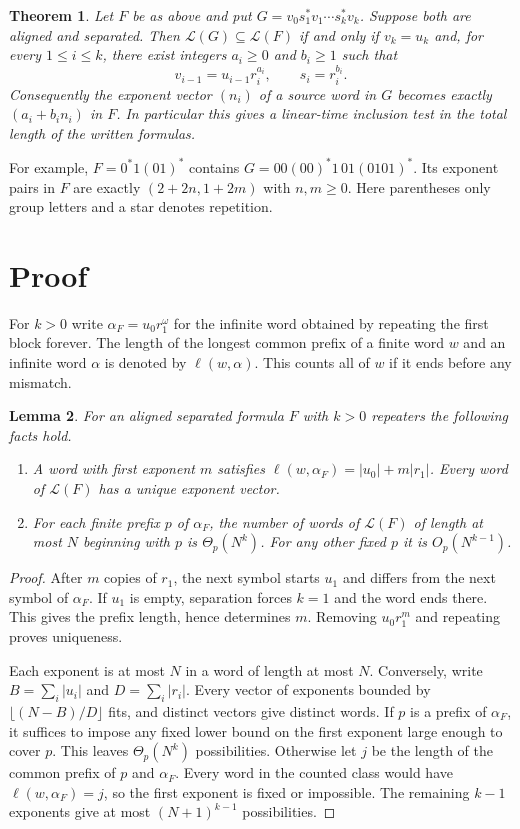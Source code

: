 \documentclass[11pt]{article}
\newtheorem{theorem}{Theorem}
\newtheorem{lemma}[theorem]{Lemma}
\newcommand{\Lang}{\mathcal L}
\begin{document}
\begin{theorem}\label{main}
Let $F$ be as above and put $G=v_0 s_1^*v_1\cdots s_k^*v_k$. Suppose both are aligned and separated. Then $\Lang(G)\subseteq\Lang(F)$ if and only if $v_k=u_k$ and, for every $1\le i\le k$, there exist integers $a_i\ge0$ and $b_i\ge1$ such that
\[
             v_{i-1}=u_{i-1}r_i^{a_i},
             \qquad s_i=r_i^{b_i}.
\]
Consequently the exponent vector $(n_i)$ of a source word in $G$ becomes exactly $(a_i+b_i n_i)$ in $F$. In particular this gives a linear-time inclusion test in the total length of the written formulas.
\end{theorem}

For example, $F=0^*1(01)^*$ contains $G=00(00)^*1\,01(0101)^*$. Its exponent pairs in $F$ are exactly $(2+2n,1+2m)$ with $n,m\ge0$. Here parentheses only group letters and a star denotes repetition.

\section*{Proof}
For $k>0$ write $\alpha_F=u_0r_1^\omega$ for the infinite word obtained by repeating the first block forever. The length of the longest common prefix of a finite word $w$ and an infinite word $\alpha$ is denoted by $\ell(w,\alpha)$. This counts all of $w$ if it ends before any mismatch.

\begin{lemma}\label{prefix}
For an aligned separated formula $F$ with $k>0$ repeaters the following facts hold.
\begin{enumerate}
\item A word with first exponent $m$ satisfies $\ell(w,\alpha_F)=|u_0|+m|r_1|$. Every word of $\Lang(F)$ has a unique exponent vector.
\item For each finite prefix $p$ of $\alpha_F$, the number of words of $\Lang(F)$ of length at most $N$ beginning with $p$ is $\Theta_p(N^k)$. For any other fixed $p$ it is $O_p(N^{k-1})$.
\end{enumerate}
\end{lemma}
\begin{proof}
After $m$ copies of $r_1$, the next symbol starts $u_1$ and differs from the next symbol of $\alpha_F$. If $u_1$ is empty, separation forces $k=1$ and the word ends there. This gives the prefix length, hence determines $m$. Removing $u_0r_1^m$ and repeating proves uniqueness.

Each exponent is at most $N$ in a word of length at most $N$. Conversely, write $B=\sum_i|u_i|$ and $D=\sum_i|r_i|$. Every vector of exponents bounded by $\lfloor(N-B)/D\rfloor$ fits, and distinct vectors give distinct words. If $p$ is a prefix of $\alpha_F$, it suffices to impose any fixed lower bound on the first exponent large enough to cover $p$. This leaves $\Theta_p(N^k)$ possibilities. Otherwise let $j$ be the length of the common prefix of $p$ and $\alpha_F$. Every word in the counted class would have $\ell(w,\alpha_F)=j$, so the first exponent is fixed or impossible. The remaining $k-1$ exponents give at most $(N+1)^{k-1}$ possibilities.
\end{proof}
\end{document}

